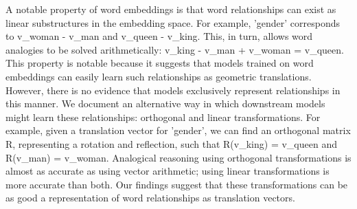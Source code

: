 A notable property of word embeddings is that word relationships can exist as linear substructures in the embedding space. For example, 'gender' corresponds to v\_woman - v\_man and v\_queen - v\_king. This, in turn, allows word analogies to be solved arithmetically: v\_king - v\_man + v\_woman = v\_queen. This property is notable because it suggests that models trained on word embeddings can easily learn such relationships as geometric translations. However, there is no evidence that models exclusively represent relationships in this manner. We document an alternative way in which downstream models might learn these relationships: orthogonal and linear transformations. For example, given a translation vector for 'gender', we can find an orthogonal matrix R, representing a rotation and reflection, such that R(v\_king) = v\_queen and R(v\_man) = v\_woman. Analogical reasoning using orthogonal transformations is almost as accurate as using vector arithmetic; using linear transformations is more accurate than both. Our findings suggest that these transformations can be as good a representation of word relationships as translation vectors.